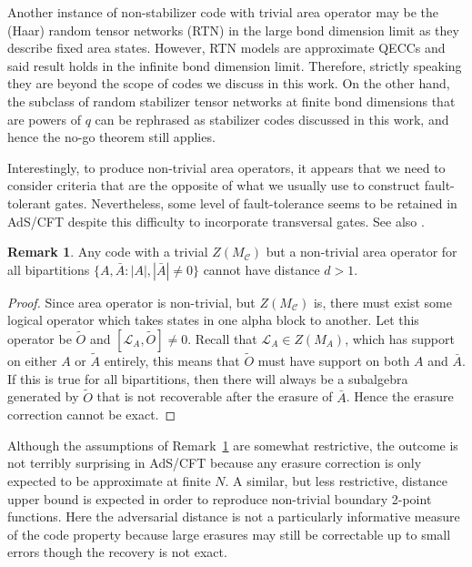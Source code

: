 \documentclass[a4paper,11pt]{article}
\theoremstyle{definition}
\newtheorem{remark}{Remark}[section]
\numberwithin{equation}{section}
\begin{document}
Another instance of non-stabilizer code with trivial area operator may be the (Haar) random tensor networks (RTN) in the large bond dimension limit\cite{Hayden:2016cfa} as they describe fixed area states\cite{Akers:2018fow,Dong:2018seb}. However, RTN models are approximate QECCs and said result holds in the infinite bond dimension limit. Therefore, strictly speaking they are beyond the scope of codes we discuss in this work. On the other hand, the subclass of random stabilizer tensor networks at finite bond dimensions that are powers of $q$ can be rephrased as stabilizer codes discussed in this work, and hence the no-go theorem still applies.

Interestingly, to produce non-trivial area operators, it appears that we need to consider criteria that are the opposite of what we usually use to construct fault-tolerant gates. Nevertheless, some level of fault-tolerance seems to be retained  in AdS/CFT \cite{threshold} despite this difficulty to incorporate transversal gates. See also \cite{Woods,Faist,Cree:2021rxi}. 

\begin{remark}\label{rmk:erasure}
Any code with a trivial $Z(M_{\mathcal{C}})$ but a non-trivial area operator for all bipartitions 
 $\{A,\bar{A}: |A|,|\bar{A}|\ne 0\}$ cannot have distance $d>1$.
\end{remark}
\begin{proof}
Since area operator is non-trivial, but $Z(M_{\mathcal{C}})$ is, there must exist some logical operator which takes states in one alpha block to another. Let this operator be $\tilde{O}$ and $[\mathcal{L}_A,\tilde{O}]\ne 0$. Recall that $\mathcal{L}_A\in Z(M_A)$, which has support on either $A$ or $\tilde{A}$ entirely, this means that $\tilde{O}$ must have support on both $A$ and $\bar{A}$. If this is true for all bipartitions, then there will always be a subalgebra generated by $\tilde{O}$ that is not recoverable after the erasure of $\bar{A}$. Hence the erasure correction cannot be exact. 
\end{proof}

Although the assumptions of Remark~\ref{rmk:erasure} are somewhat restrictive, the outcome is not terribly surprising in AdS/CFT because  any erasure correction is only expected to be approximate at finite $N$.
A similar, but less restrictive, distance upper bound is expected in order to reproduce non-trivial boundary 2-point functions\cite{HMERA}. Here the adversarial distance is not a particularly informative measure of the code property because large erasures may still be correctable up to small errors though the recovery is not exact.
\end{document}
